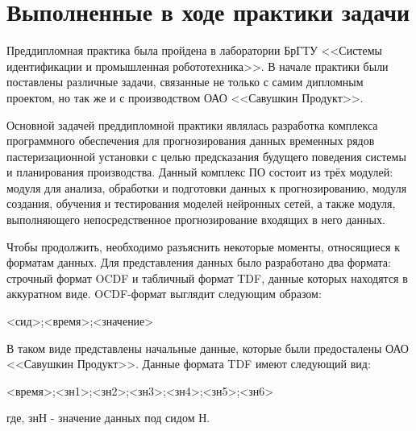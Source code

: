 \sectionbreak \section*{ 
    \gostTitleFont
    \redline
    Выполненные в ходе практики задачи
}

\subtitlespace

{\gostFont
    \par \redline Преддипломная практика была пройдена в лаборатории БрГТУ <<Системы идентификации и промышленная робототехника>>. В начале практики были поставлены различные задачи, связанные не только с самим дипломным проектом, но так же и с производством ОАО <<Савушкин Продукт>>. 

    \par \redline Основной задачей преддипломной практики являлась разработка комплекса программного обеспечения для прогнозирования данных временных рядов пастеризационной установки с целью предсказания будущего поведения системы и планирования производства. Данный комплекс ПО состоит из трёх модулей: модуля для анализа, обработки и подготовки данных к прогнозированию, модуля создания, обучения и тестирования моделей нейронных сетей, а также модуля, выполняющего непосредственное прогнозирование входящих в него данных.  

    \par \redline Чтобы продолжить, необходимо разъяснить некоторые моменты, относящиеся к форматам данных. Для представления данных было разработано два формата: строчный формат OCDF и табличный формат TDF, данные которых находятся в аккуратном виде. OCDF-формат выглядит следующим образом:

    \begin{Center}
        <сид>;<время>;<значение>
    \end{Center}

    \par \redline В таком виде представлены начальные данные, которые были предосталены ОАО <<Савушкин Продукт>>. Данные формата TDF имеют следующий вид:

    \begin{Center}
        <время>;<зн1>;<зн2>;<зн3>;<зн4>;<зн5>;<зн6>
    \end{Center}

    где, знН - значение данных под сидом Н.

}
